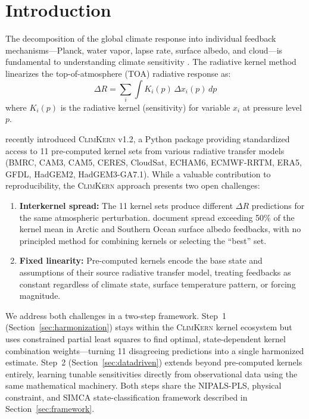 \documentclass[11pt]{article}
\newcommand{\oldsystem}{\textsc{ClimKern}}
\begin{document}
\section{Introduction}
\label{sec:intro}

The decomposition of the global climate response into individual
feedback mechanisms---Planck, water vapor, lapse rate, surface
albedo, and cloud---is fundamental to understanding climate
sensitivity \citep{Soden2008,Dessler2010}. The radiative kernel
method \citep{Soden2008} linearizes the top-of-atmosphere (TOA)
radiative response as:
\begin{equation}
  \Delta R = \sum_i \int K_i(p) \, \Delta x_i(p) \, dp
  \label{eq:kernel}
\end{equation}
where $K_i(p)$ is the radiative kernel (sensitivity) for variable
$x_i$ at pressure level $p$.

\citet{Janoski2025} recently introduced \oldsystem{} v1.2, a
Python package providing standardized access to 11 pre-computed
kernel sets from various radiative transfer models (BMRC, CAM3,
CAM5, CERES, CloudSat, ECHAM6, ECMWF-RRTM, ERA5, GFDL, HadGEM2,
HadGEM3-GA7.1). While a valuable contribution to reproducibility,
the \oldsystem{} approach presents two open challenges:

\begin{enumerate}[noitemsep]
  \item \textbf{Interkernel spread:} The 11 kernel sets produce
    different $\Delta R$ predictions for the same atmospheric
    perturbation. \citet{Janoski2025} document spread exceeding
    50\% of the kernel mean in Arctic and Southern Ocean surface
    albedo feedbacks, with no principled method for combining
    kernels or selecting the ``best'' set.
  \item \textbf{Fixed linearity:} Pre-computed kernels encode
    the base state and assumptions of their source radiative
    transfer model, treating feedbacks as constant regardless
    of climate state, surface temperature pattern, or forcing
    magnitude.
\end{enumerate}

We address both challenges in a two-step framework. Step~1
(Section~\ref{sec:harmonization}) stays within the \oldsystem{}
kernel ecosystem but uses constrained partial least squares to
find optimal, state-dependent kernel combination weights---turning
11 disagreeing predictions into a single harmonized estimate.
Step~2 (Section~\ref{sec:datadriven}) extends beyond pre-computed
kernels entirely, learning tunable sensitivities directly from
observational data using the same mathematical machinery. Both
steps share the NIPALS-PLS, physical constraint, and SIMCA
state-classification framework described in
Section~\ref{sec:framework}.
\end{document}
